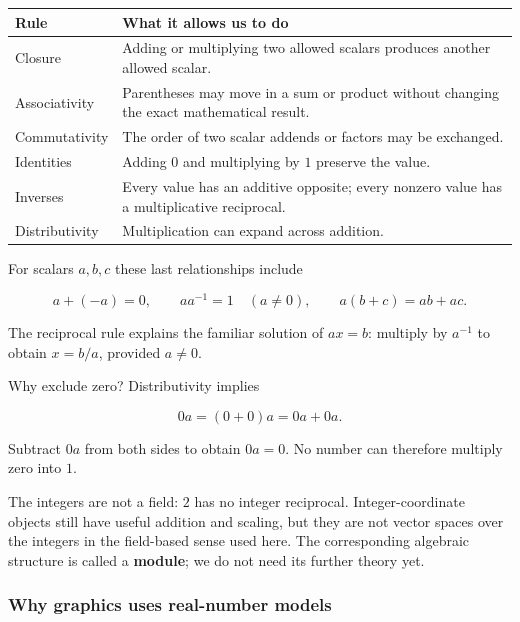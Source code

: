 {\def\LTcaptype{none} %
\begin{longtable}[]{@{}
  >{\raggedright\arraybackslash}p{}
  >{\raggedright\arraybackslash}p{}@{}}
\toprule\noalign{}
\begin{minipage}[b]{\linewidth}\raggedright
Rule
\end{minipage} & \begin{minipage}[b]{\linewidth}\raggedright
What it allows us to do
\end{minipage} \\
\midrule\noalign{}
\endhead
\bottomrule\noalign{}
\endlastfoot
Closure & Adding or multiplying two allowed scalars produces another allowed scalar. \\
Associativity & Parentheses may move in a sum or product without changing the exact mathematical result. \\
Commutativity & The order of two scalar addends or factors may be exchanged. \\
Identities & Adding \(0\) and multiplying by \(1\) preserve the value. \\
Inverses & Every value has an additive opposite; every nonzero value has a multiplicative reciprocal. \\
Distributivity & Multiplication can expand across addition. \\
\end{longtable}
}

For scalars \(a,b,c\) these last relationships include

\[
a+(-a)=0,\qquad aa^{-1}=1\quad(a\ne0),\qquad a(b+c)=ab+ac.
\]

The reciprocal rule explains the familiar solution of \(ax=b\): multiply by \(a^{-1}\) to obtain \(x=b/a\), provided \(a\ne0\).

Why exclude zero? Distributivity implies

\[
0a=(0+0)a=0a+0a.
\]

Subtract \(0a\) from both sides to obtain \(0a=0\). No number can therefore multiply zero into \(1\).

The integers are not a field: \(2\) has no integer reciprocal. Integer-coordinate objects still have useful addition and scaling, but they are not vector spaces over the integers in the field-based sense used here. The corresponding algebraic structure is called a \textbf{module}; we do not need its further theory yet.

\subsubsection{Why graphics uses real-number models}\label{01-foundations-i-ch017-why-graphics-uses-real-number-models}

